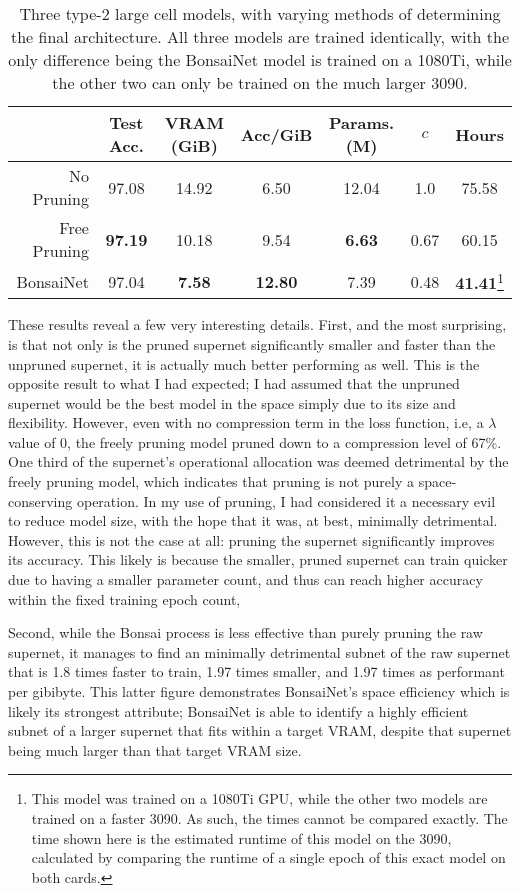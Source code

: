 \begin{table}[h]
\begin{center}
	\begin{minipage}{\linewidth}
	\begin{tabular}{r|c|c|c|c|c|c}
	 & Test Acc. & VRAM (GiB) & Acc/GiB & Params. (M) & $c$ & Hours \\
	\hline
	No Pruning   & 97.08 & 14.92 & 6.50 & 12.04 & 1.0 & 75.58 \\
	Free Pruning & \textbf{97.19} & 10.18 & 9.54 & \textbf{6.63} & 0.67 & 60.15 \\
	BonsaiNet	 & 97.04 & \textbf{7.58 } & \textbf{12.80} & 7.39  & 0.48 & \textbf{41.41}\footnote{This model was trained on a 1080Ti GPU,
		 while the other two models are trained on a faster 3090. As such, the times cannot be compared exactly. The time shown here is the estimated runtime of this model on the 3090, calculated by comparing
	 the runtime of a single epoch of this exact model on both cards.}
	\end{tabular}
	\end{minipage}
\end{center}
\caption{Three type-2 large cell models, with varying methods of determining the final architecture. All three models are
trained identically, with the only difference being the BonsaiNet model is trained on a 1080Ti, while the other two
	can only be trained on the much larger 3090.}
\label{tab:pruning3090}
\end{table}

These results reveal a few very interesting details. First, and the most surprising, is that not only is the pruned
supernet significantly smaller and faster than the unpruned supernet, it is actually much better performing as well.
This is the opposite result to what I had expected; I had assumed that the unpruned supernet would be the best model in the
space simply due to its size and flexibility. However, even with no compression term in the loss function, i.e, a $\lambda$
value of 0, the freely pruning model pruned down to a compression level of 67\%. One third of the supernet's
operational allocation was deemed detrimental by the freely pruning model, which indicates that pruning is not purely
a space-conserving operation. In my use of pruning, I had considered it a necessary evil to reduce model size, with the
hope that it was, at best, minimally detrimental. However, this is not the case at all: pruning the supernet significantly
improves its accuracy. This likely is because the smaller, pruned supernet can train quicker due to having a smaller
parameter count, and thus can reach higher accuracy within the fixed training epoch count,

Second, while the Bonsai process is less effective than purely pruning the raw supernet, it manages to find an minimally
detrimental subnet of the raw supernet that is 1.8 times faster to train, 1.97 times smaller, and 1.97 times as performant
per gibibyte. This latter figure demonstrates BonsaiNet's space efficiency which is likely its strongest attribute;
BonsaiNet is able to identify a highly efficient subnet of a larger supernet that fits within a target VRAM,
despite that supernet being much larger than that target VRAM size.